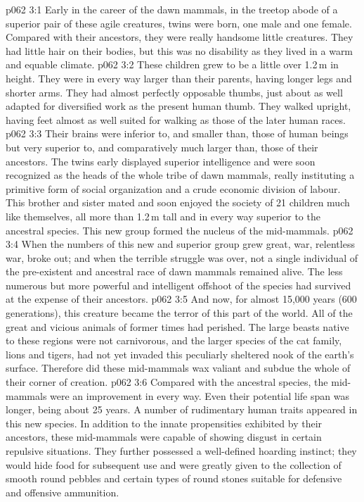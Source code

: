 \vs p062 3:1 Early in the career of the dawn mammals, in the treetop abode of a superior pair of these agile creatures, twins were born, one male and one female. Compared with their ancestors, they were really handsome little creatures. They had little hair on their bodies, but this was no disability as they lived in a warm and equable climate.
\vs p062 3:2 These children grew to be a little over 1.2\,m in height. They were in every way larger than their parents, having longer legs and shorter arms. They had almost perfectly opposable thumbs, just about as well adapted for diversified work as the present human thumb. They walked upright, having feet almost as well suited for walking as those of the later human races.
\vs p062 3:3 Their brains were inferior to, and smaller than, those of human beings but very superior to, and comparatively much larger than, those of their ancestors. The twins early displayed superior intelligence and were soon recognized as the heads of the whole tribe of dawn mammals, really instituting a primitive form of social organization and a crude economic division of labour. This brother and sister mated and soon enjoyed the society of 21 children much like themselves, all more than 1.2\,m tall and in every way superior to the ancestral species. This new group formed the nucleus of the mid\hyp{}mammals.
\vs p062 3:4 When the numbers of this new and superior group grew great, war, relentless war, broke out; and when the terrible struggle was over, not a single individual of the pre\hyp{}existent and ancestral race of dawn mammals remained alive. The less numerous but more powerful and intelligent offshoot of the species had survived at the expense of their ancestors.
\vs p062 3:5 And now, for almost 15,000 years (600 generations), this creature became the terror of this part of the world. All of the great and vicious animals of former times had perished. The large beasts native to these regions were not carnivorous, and the larger species of the cat family, lions and tigers, had not yet invaded this peculiarly sheltered nook of the earth’s surface. Therefore did these mid\hyp{}mammals wax valiant and subdue the whole of their corner of creation.
\vs p062 3:6 \pc Compared with the ancestral species, the mid\hyp{}mammals were an improvement in every way. Even their potential life span was longer, being about 25 years. A number of rudimentary human traits appeared in this new species. In addition to the innate propensities exhibited by their ancestors, these mid\hyp{}mammals were capable of showing disgust in certain repulsive situations. They further possessed a well\hyp{}defined hoarding instinct; they would hide food for subsequent use and were greatly given to the collection of smooth round pebbles and certain types of round stones suitable for defensive and offensive ammunition.
